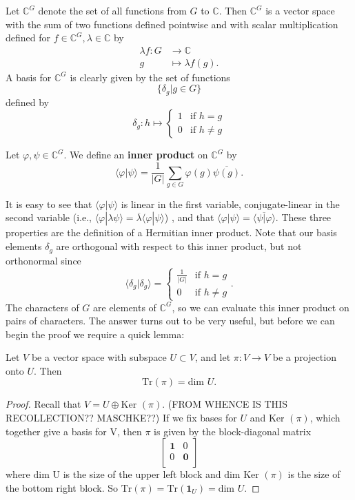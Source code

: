 \begin{defn}
Let $\mathbb{C}^G$ denote the set of all functions from $G$ to $\mathbb{C}$.  Then $\mathbb{C}^G$ is a vector space with the sum of two functions defined pointwise and with scalar multiplication defined for $f \in \mathbb{C}^G, \lambda \in \mathbb{C}$ by 
\begin{align*}
\lambda f \colon G &\to \mathbb{C} \\
g &\mapsto \lambda f(g).
\end{align*}
A basis for $\mathbb{C}^G$ is clearly given by the set of functions 
\[\{ \delta_g | g \in G  \} \]
defined by 
\[ \delta_g \colon h \mapsto \begin{cases}  1 &\text{if } h = g \\
 0 &\text{if } h \neq g
\end{cases} \]
\end{defn}

\begin{defn}
Let $\varphi, \psi \in \mathbb{C}^G$.  We define an \textbf{inner product}  on $\mathbb{C}^G$ by 
\[ \langle \varphi | \psi \rangle = \frac{1}{|G|} \sum_{g \in G} \varphi(g) \overline{\psi(g)}.\]
\end{defn}
It is easy to see that $\langle \varphi | \psi \rangle$ is linear in the first variable, conjugate-linear in the second variable (i.e., $\langle \varphi | \lambda \psi \rangle = \overline{\lambda}	\langle \varphi | \psi \rangle$) , and that $\langle \varphi | \psi \rangle = \overline {\langle \psi | \varphi \rangle}$.  These three properties are the definition of a Hermitian inner product.  Note that our basis elements $\delta_g$ are orthogonal with respect to this inner product, but not orthonormal since 
\[ \langle \delta_g | \delta_g \rangle = \begin{cases} \frac{1}{|G|} &\mbox{if } h = g \\ 0 &\mbox{if } h \neq g \end{cases}. \]
The characters of $G$ are elements of $\mathbb{C}^G$, so we can evaluate this inner product on pairs of characters.  The answer turns out to be very useful, but before we can begin the proof we require a quick lemma:

\begin{lemma}
Let $V$ be a vector space with subspace $U \subset V$, and let $\pi \colon V \to V$ be a projection onto $U$.  Then 
\[ \text{Tr}(\pi) = \text{dim } U. \]
\end{lemma}
\begin{proof}
Recall that $V = U \oplus \text{Ker }(\pi)$.  (FROM WHENCE IS THIS RECOLLECTION??  MASCHKE??)  If we fix bases for $U$ and $\text{Ker }(\pi)$, which together give a basis for V, then $\pi$ is given by the block-diagonal matrix
\[   \begin{bmatrix}
\mathbf{1} & 0 \\
0 & \mathbf{0} \\
\end{bmatrix} \]
where $\text{dim U}$ is the size of the upper left block and $\text{dim Ker }(\pi)$ is the size of the bottom right block.  So $\text{Tr}(\pi) = \text{Tr}(\mathbf{1}_U) = \text{dim } U$.
\end{proof}


